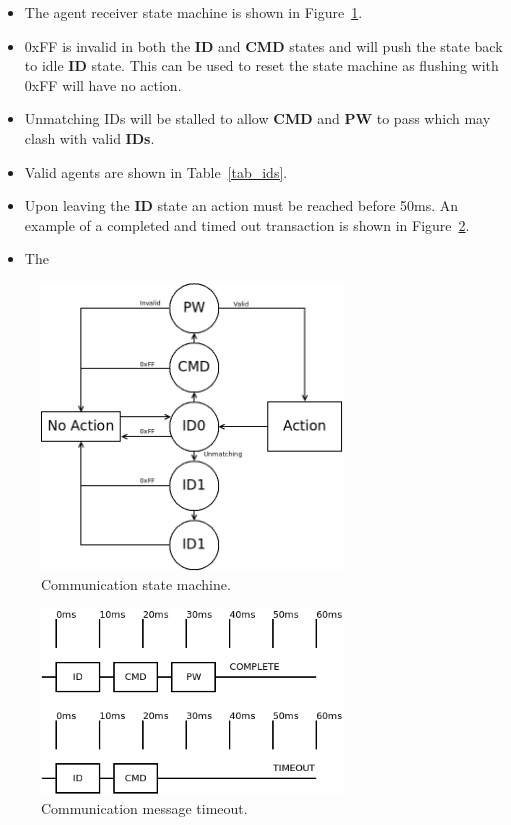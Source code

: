 \documentclass[a4paper]{article}
\begin{document}
\begin{itemize}
   \item    The agent receiver state machine is shown in Figure~\ref{fig_communications_sm}.
   \item    0xFF is invalid in both the \textbf{ID} and \textbf{CMD} states and will 
            push the state back to idle \textbf{ID} state. This can be used to reset the state machine
            as flushing with 0xFF will have no action.
   \item    Unmatching IDs will be stalled to allow \textbf{CMD} and \textbf{PW} to pass which may clash with valid \textbf{IDs}. 
   \item    Valid agents are shown in Table~\ref{tab_ids}.
   \item    Upon leaving the \textbf{ID} state an action must be reached before 50ms.
            An example of a completed and timed out transaction is shown in Figure~\ref{fig_communications_wave}.
   \item    The 
\end{itemize}

\begin{figure}[h]
   \centering
   \label{fig_communications_sm}
   \includegraphics[width=8cm,keepaspectratio]{communications/communications_sm.png} 
   \caption{Communication state machine.}
\end{figure}

\begin{figure}[h]
   \centering
   \label{fig_communications_wave}
   \includegraphics[width=8cm,keepaspectratio]{communications/communications_wave.png} 
   \caption{Communication message timeout.}
\end{figure}
\end{document}
